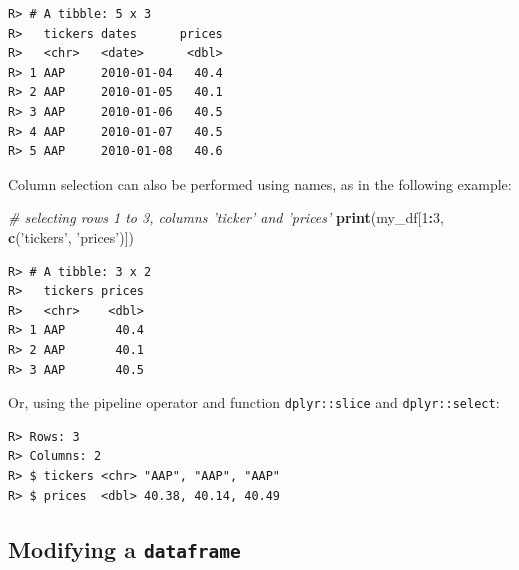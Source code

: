 \documentclass[
  12pt,
]{book}
\newenvironment{Shaded}{\begin{snugshade}}{\end{snugshade}}
\newcommand{\CommentTok}[1]{\textcolor[rgb]{0.37,0.37,0.37}{\textit{#1}}}
\newcommand{\DecValTok}[1]{\textcolor[rgb]{0.06,0.06,0.06}{#1}}
\newcommand{\KeywordTok}[1]{\textcolor[rgb]{0.27,0.27,0.27}{\textbf{#1}}}
\newcommand{\NormalTok}[1]{#1}
\newcommand{\OperatorTok}[1]{\textcolor[rgb]{0.43,0.43,0.43}{\textbf{#1}}}
\newcommand{\StringTok}[1]{\textcolor[rgb]{0.5,0.5,0.5}{#1}}
\begin{document}
\begin{verbatim}
R> # A tibble: 5 x 3
R>   tickers dates      prices
R>   <chr>   <date>      <dbl>
R> 1 AAP     2010-01-04   40.4
R> 2 AAP     2010-01-05   40.1
R> 3 AAP     2010-01-06   40.5
R> 4 AAP     2010-01-07   40.5
R> 5 AAP     2010-01-08   40.6
\end{verbatim}

Column selection can also be performed using names, as in the following example:

\begin{Shaded}
\begin{Highlighting}[]
\CommentTok{# selecting rows 1 to 3, columns 'ticker' and 'prices'}
\KeywordTok{print}\NormalTok{(my_df[}\DecValTok{1}\OperatorTok{:}\DecValTok{3}\NormalTok{, }\KeywordTok{c}\NormalTok{(}\StringTok{'tickers'}\NormalTok{, }\StringTok{'prices'}\NormalTok{)])}
\end{Highlighting}
\end{Shaded}

\begin{verbatim}
R> # A tibble: 3 x 2
R>   tickers prices
R>   <chr>    <dbl>
R> 1 AAP       40.4
R> 2 AAP       40.1
R> 3 AAP       40.5
\end{verbatim}

Or, using the pipeline operator and function \texttt{dplyr::slice} and \texttt{dplyr::select}: 

\begin{Shaded}
\end{Shaded}

\begin{verbatim}
R> Rows: 3
R> Columns: 2
R> $ tickers <chr> "AAP", "AAP", "AAP"
R> $ prices  <dbl> 40.38, 40.14, 40.49
\end{verbatim}

\hypertarget{modifying-a-dataframe}{%
\subsection{\texorpdfstring{Modifying a \texttt{dataframe}}{Modifying a dataframe}}\label{modifying-a-dataframe}}
\end{document}
